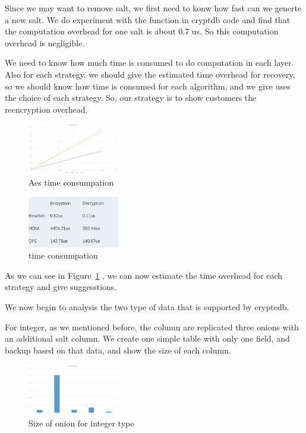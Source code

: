 Since we may want to remove salt, we first need to konw how fast can we generte a new salt. We do experiment with the function in cryptdb code and find that the computation overhead for one salt is about 0.7 us. So this computation overhead is negligible.

We need to know how much time is consumed to do computation in each layer. Also for each strategy, we should give the estimated time overhead for recovery, so we should know how time is consumed for each algorithm, and we give uses the choice of each strategy. So, our strategy is to show customers the reencryption overhead. 


\begin{figure}[tb]
\centering
\includegraphics[width=4cm]{images/aes.png}
\caption{Aes time consumpation}
\label{fig:stack9}
\end{figure}


\begin{figure}[tb]
\centering
\includegraphics[width=4cm]{images/time.png}
\caption{time consumpation}
\label{fig:stack10}
\end{figure}

As we can see in Figure~\ref{fig:stack9} , we can now estimate the time overhead for each strategy and give suggesstions.


We now begin to analysis the two type of data that is supported by cryptedb.

For integer, as we mentioned before, the column are replicated three onions with an additional salt column. We create one simple table with only one field, and backup based on that data, and show the size of each column.


\begin{figure}[tb]
\centering
\includegraphics[width=4cm]{images/sizeofeachonion.png}
\caption{Size of onion for integer type}
\label{fig:stack11}
\end{figure}


